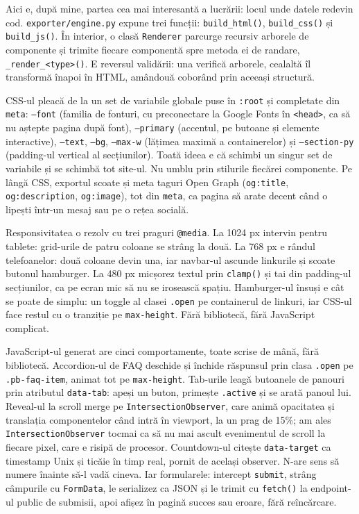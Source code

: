 \documentclass[12pt,a4paper]{report}
\begin{document}
Aici e, după mine, partea cea mai interesantă a lucrării: locul unde datele redevin
cod. \texttt{exporter/engine.py} expune trei funcții: \texttt{build\_html()},
\texttt{build\_css()} și \texttt{build\_js()}. În interior, o clasă \texttt{Renderer}
parcurge recursiv arborele de componente și trimite fiecare componentă spre metoda ei
de randare, \texttt{\_render\_<type>()}. E reversul validării: una verifică
arborele, cealaltă îl transformă înapoi în HTML, amândouă coborând prin aceeași
structură.

CSS-ul pleacă de la un set de variabile globale puse în \texttt{:root} și completate
din \texttt{meta}: \texttt{--font} (familia de fonturi, cu preconectare la Google
Fonts în \texttt{<head>}, ca să nu aștepte pagina după font), \texttt{--primary}
(accentul, pe butoane și elemente interactive), \texttt{--text}, \texttt{--bg},
\texttt{--max-w} (lățimea maximă a containerelor) și \texttt{--section-py} (padding-ul
vertical al secțiunilor). Toată ideea e că schimbi un singur set de variabile și se
schimbă tot site-ul. Nu umblu prin stilurile fiecărei componente. Pe lângă CSS,
exportul scoate și meta taguri Open Graph (\texttt{og:title}, \texttt{og:description},
\texttt{og:image}), tot din \texttt{meta}, ca pagina să arate decent când o lipești
într-un mesaj sau pe o rețea socială.

Responsivitatea o rezolv cu trei praguri \texttt{@media}. La 1024 px intervin pentru
tablete: grid-urile de patru coloane se strâng la două. La 768 px e rândul
telefoanelor: două coloane devin una, iar navbar-ul ascunde linkurile și scoate
butonul hamburger. La 480 px micșorez textul prin \texttt{clamp()} și tai din
padding-ul secțiunilor, ca pe ecran mic să nu se irosească spațiu. Hamburger-ul însuși
e cât se poate de simplu: un toggle al clasei \texttt{.open} pe containerul de
linkuri, iar CSS-ul face restul cu o tranziție pe \texttt{max-height}. Fără bibliotecă,
fără JavaScript complicat.

JavaScript-ul generat are cinci comportamente, toate scrise de mână, fără bibliotecă.
Accordion-ul de FAQ deschide și închide răspunsul prin clasa \texttt{.open} pe
\texttt{.pb-faq-item}, animat tot pe \texttt{max-height}. Tab-urile leagă butoanele de
panouri prin atributul \texttt{data-tab}: apeși un buton, primește \texttt{.active}
și se arată panoul lui. Reveal-ul la scroll merge pe \texttt{IntersectionObserver},
care animă opacitatea și translația componentelor când intră în viewport, la un prag
de 15\%; am ales \texttt{IntersectionObserver} tocmai ca să nu mai ascult evenimentul
de scroll la fiecare pixel, care e risipă de procesor. Countdown-ul citește
\texttt{data-target} ca timestamp Unix și ticăie în timp real, pornit de același
observer. N-are sens să numere înainte să-l vadă cineva. Iar formularele: intercept
\texttt{submit}, strâng câmpurile cu \texttt{FormData}, le serializez ca JSON și le
trimit cu \texttt{fetch()} la endpoint-ul public de submisii, apoi afișez în pagină
succes sau eroare, fără reîncărcare.
\end{document}
